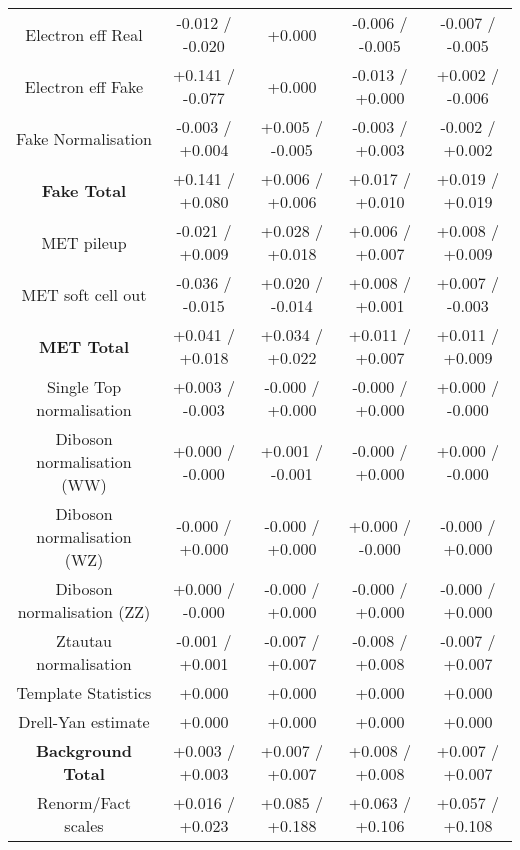 \begin{table}[htbp]
\begin{center}
\begin{tabular}{|c|c|c|c|c|}
Electron eff Real                     &-0.012   / -0.020   & +0.000              & -0.006   / -0.005   & -0.007   / -0.005  \\
Electron eff Fake                     &+0.141   / -0.077   & +0.000              & -0.013   / +0.000   & +0.002   / -0.006  \\
Fake Normalisation                    &-0.003   / +0.004   & +0.005   / -0.005   & -0.003   / +0.003   & -0.002   / +0.002  \\
\hline
\textbf{Fake Total}                   &+0.141   / +0.080   & +0.006   / +0.006   & +0.017   / +0.010   & +0.019   / +0.019  \\
\hline
MET pileup                            &-0.021   / +0.009   & +0.028   / +0.018   & +0.006   / +0.007   & +0.008   / +0.009  \\
MET soft cell out                     &-0.036   / -0.015   & +0.020   / -0.014   & +0.008   / +0.001   & +0.007   / -0.003  \\
\hline
\textbf{MET Total}                    &+0.041   / +0.018   & +0.034   / +0.022   & +0.011   / +0.007   & +0.011   / +0.009  \\
\hline
Single Top normalisation              &+0.003   / -0.003   & -0.000   / +0.000   & -0.000   / +0.000   & +0.000   / -0.000  \\
Diboson normalisation (WW)            &+0.000   / -0.000   & +0.001   / -0.001   & -0.000   / +0.000   & +0.000   / -0.000  \\
Diboson normalisation (WZ)            &-0.000   / +0.000   & -0.000   / +0.000   & +0.000   / -0.000   & -0.000   / +0.000  \\
Diboson normalisation (ZZ)            &+0.000   / -0.000   & -0.000   / +0.000   & -0.000   / +0.000   & -0.000   / +0.000  \\
Ztautau normalisation                 &-0.001   / +0.001   & -0.007   / +0.007   & -0.008   / +0.008   & -0.007   / +0.007  \\
Template Statistics                   &+0.000              & +0.000              & +0.000              & +0.000             \\
Drell-Yan estimate                    &+0.000              & +0.000              & +0.000              & +0.000             \\
\hline
\textbf{Background Total}             &+0.003   / +0.003   & +0.007   / +0.007   & +0.008   / +0.008   & +0.007   / +0.007  \\
\hline
Renorm/Fact scales                    &+0.016   / +0.023   & +0.085   / +0.188   & +0.063   / +0.106   & +0.057   / +0.108  \\

\end{tabular}
\end{center}
\end{table}

